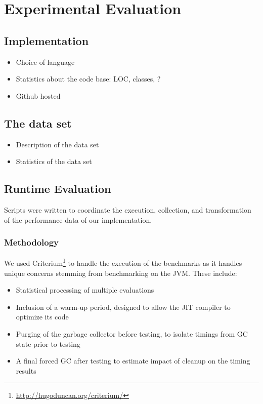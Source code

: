 \chapter{Experimental Evaluation}
	\section{Implementation}
		\begin{itemize}
			\item Choice of language
			\item Statistics about the code base: LOC, classes, ?
			\item Github hosted
		\end{itemize}
	
	\section{The data set}
		\begin{itemize}
			\item Description of the data set
			\item Statistics of the data set
		\end{itemize}
	
	\section{Runtime Evaluation}
		Scripts were written to coordinate the execution, collection, and transformation of the performance data of our implementation.
		
		\subsection{Methodology}
			We used Criterium\footnote{\url{http://hugoduncan.org/criterium/}} to handle the execution of the benchmarks as it handles unique concerns stemming from benchmarking on the JVM.  These include:
			
			\begin{itemize}
				\item Statistical processing of multiple evaluations
				\item Inclusion of a warm-up period, designed to allow the JIT compiler to optimize its code
				\item Purging of the garbage collector before testing, to isolate timings from GC state prior to testing
				\item A final forced GC after testing to estimate impact of cleanup on the timing results
			\end{itemize}
		
